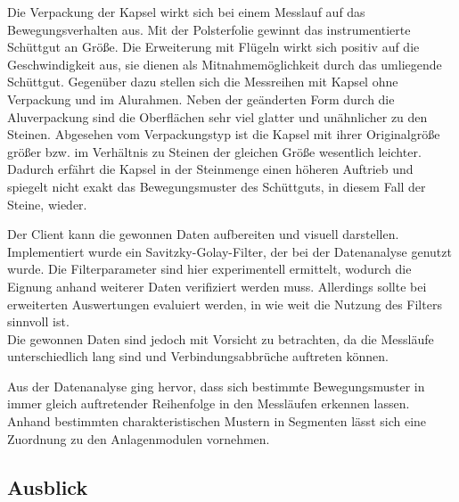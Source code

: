 Die Verpackung der Kapsel wirkt sich bei einem Messlauf auf das Bewegungsverhalten aus. Mit der Polsterfolie gewinnt das instrumentierte Schüttgut an Größe. Die Erweiterung mit Flügeln wirkt sich positiv auf die Geschwindigkeit aus, sie dienen als Mitnahmemöglichkeit durch das umliegende Schüttgut. Gegenüber dazu stellen sich die Messreihen mit Kapsel ohne Verpackung und im Alurahmen. Neben der geänderten Form durch die Aluverpackung sind die Oberflächen sehr viel glatter und unähnlicher zu den Steinen. 
Abgesehen vom Verpackungstyp ist die Kapsel mit ihrer Originalgröße größer bzw. im Verhältnis zu Steinen der gleichen Größe wesentlich leichter. Dadurch erfährt die Kapsel in der Steinmenge einen höheren Auftrieb und spiegelt nicht exakt das Bewegungsmuster des Schüttguts, in diesem Fall der Steine, wieder. 

Der Client kann die gewonnen Daten aufbereiten und visuell darstellen. Implementiert wurde ein Savitzky-Golay-Filter, der bei der Datenanalyse genutzt wurde. Die Filterparameter sind hier experimentell ermittelt, wodurch die Eignung anhand weiterer Daten verifiziert werden muss. Allerdings sollte bei erweiterten Auswertungen evaluiert werden, in wie weit die Nutzung des Filters sinnvoll ist. \\
Die gewonnen Daten sind jedoch mit Vorsicht zu betrachten, da die Messläufe unterschiedlich lang sind und Verbindungsabbrüche auftreten können. 

Aus der Datenanalyse ging hervor, dass sich bestimmte Bewegungsmuster in immer gleich auftretender Reihenfolge in den Messläufen erkennen lassen. Anhand bestimmten charakteristischen Mustern in Segmenten lässt sich eine Zuordnung zu den Anlagenmodulen vornehmen. 

\subsection{Ausblick}

